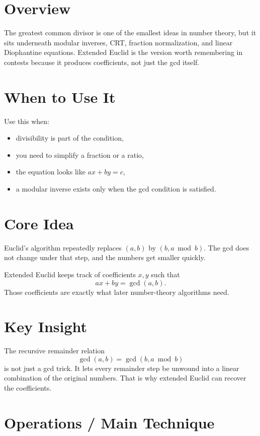 \section*{Overview}

The greatest common divisor is one of the smallest ideas in number theory, but it sits underneath modular inverses,
CRT, fraction normalization, and linear Diophantine equations. Extended Euclid is the version worth remembering in
contests because it produces coefficients, not just the gcd itself.

\section*{When to Use It}

Use this when:

\begin{itemize}
  \item divisibility is part of the condition,
  \item you need to simplify a fraction or a ratio,
  \item the equation looks like \(ax + by = c\),
  \item a modular inverse exists only when the gcd condition is satisfied.
\end{itemize}

\section*{Core Idea}

Euclid's algorithm repeatedly replaces \((a, b)\) by \((b, a \bmod b)\). The gcd does not change under that step, and
the numbers get smaller quickly.

Extended Euclid keeps track of coefficients \(x, y\) such that
\[
ax + by = \gcd(a, b).
\]
Those coefficients are exactly what later number-theory algorithms need.

\section*{Key Insight}

The recursive remainder relation
\[
\gcd(a, b) = \gcd(b, a \bmod b)
\]
is not just a gcd trick. It lets every remainder step be unwound into a linear combination of the original numbers.
That is why extended Euclid can recover the coefficients.

\section*{Operations / Main Technique}

